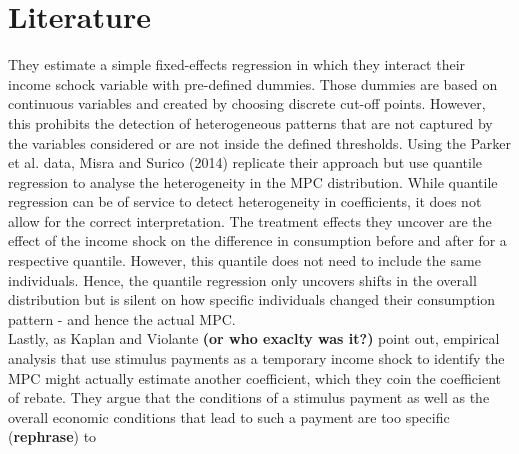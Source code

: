 \section*{Literature}
They estimate a simple fixed-effects regression in which they interact their income schock variable with pre-defined dummies. Those dummies are based on continuous variables and created by choosing discrete cut-off points. However, this prohibits the detection of heterogeneous patterns that are not captured by the variables considered or are not inside the defined thresholds. Using the Parker et al. data, Misra and Surico (2014) replicate their approach but use quantile regression to analyse the heterogeneity in the MPC distribution. While quantile regression can be of service to detect heterogeneity in coefficients, it does not allow for the correct interpretation. The treatment effects they uncover are the effect of the income shock on the difference in consumption before and after for a respective quantile. However, this quantile does not need to include the same individuals. Hence, the quantile regression only uncovers shifts in the overall distribution but is silent on how specific individuals changed their consumption pattern - and hence the actual MPC. \\
Lastly, as Kaplan and Violante \textbf{(or who exaclty was it?)} point out, empirical analysis that use stimulus payments as a temporary income shock to identify the MPC might actually estimate another coefficient, which they coin the coefficient of rebate. They argue that the conditions of a stimulus payment as well as the overall economic conditions that lead to such a payment are too specific (\textbf{rephrase}) to 